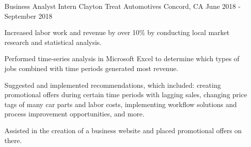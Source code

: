 \begin{cventries}
  \cventry
    {Business Analyst Intern} %
    {Clayton Treat Automotives} %
    {Concord, CA} %
    {June 2018 - September 2018} %
    {
      \begin{cvitems} %
        \item {Increased labor work and revenue by over 10\% by conducting local market research and statistical analysis.}
        \vspace{4mm}
        \begin{cvitems}
        	\item{Performed time-series analysis in Microsoft Excel to determine which types of jobs combined with time periods generated most revenue.}
        	\item {Suggested and implemented recommendations, which included: creating promotional offers during certain time periods with lagging sales, changing price tags of many car parts and labor costs, implementing workflow solutions and process improvement opportunities, and more.}
        \end{cvitems}
    	\vspace{4mm}
        \item {Assisted in the creation of a business website and placed promotional offers on there.}
      \end{cvitems}
    }
\end{cventries}

